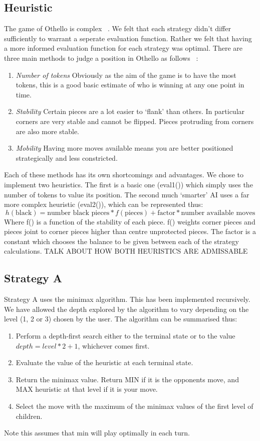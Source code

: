 \documentclass[12pt]{article}
\begin{document}
\subsection{Heuristic}
The game of Othello is complex ~\cite{post}. We felt that each strategy didn't differ sufficiently to warrant a seperate evaluation function. Rather we felt that having a more informed evaluation function for each strategy was optimal. There are three main methods to judge a position in Othello as follows ~\cite{strategy}:
\begin{enumerate}
\item \emph{Number of tokens} Obviously as the aim of the game is to have the most tokens, this is a good basic estimate of who is winning at any one point in time.
\item \emph{Stability} Certain pieces are a lot easier to `flank' than others. In particular corners are very stable and cannot be flipped. Pieces protruding from corners are also more stable.
\item \emph{Mobility} Having more moves available means you are better positioned strategically and less constricted.
\end{enumerate}
Each of these methods has its own shortcomings and advantages. We chose to implement two heuristics. The first is a basic one (eval1()) which simply uses the number of tokens to value its position. The second much `smarter' AI uses a far more complex heuristic (eval2()), which can be represented thus:
\begin{equation}
h(\mbox{black}) = \mbox{number black pieces}*f(\mbox{pieces}) + \mbox{factor}*\mbox{number available moves}
\end{equation}
Where f() is a function of the stability of each piece. f() weights corner pieces and pieces joint to corner pieces higher than centre unprotected pieces. The factor is a constant which chooses the balance to be given between each of the strategy calculations.
TALK ABOUT HOW BOTH HEURISTICS ARE ADMISSABLE

\subsection{Strategy A}
Strategy A uses the minimax algorithm. This has been implemented recursively. We have allowed the depth explored by the algorithm to vary depending on the level (1, 2 or 3) chosen by the user. The algorithm can be summarised thus:
\begin{enumerate}
\item Perform a depth-first search either to the terminal state or to the value $depth = level*2+1$, whichever comes first.
\item Evaluate the value of the heuristic at each terminal state.
\item Return the minimax value. Return MIN if it is the opponents move, and MAX heuristic at that level if it is your move.
\item Select the move with the maximum of the minimax values of the first level of children.
\end{enumerate}
Note this assumes that min will play optimally in each turn.
\end{document}
